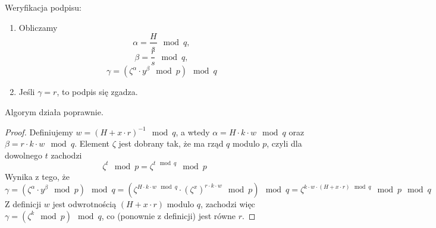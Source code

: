 \begin{greyframe}
    Weryfikacja podpisu:
    \begin{enumerate}
        \item Obliczamy
        \[
            \alpha = \frac{H}{s} \mod q,
        \]
        \[
            \beta = \frac{r}{s} \mod q,
        \]
        \[
            \gamma = (\zeta^{\alpha} \cdot y^{\beta} \mod p) \mod q
        \]
        \item Jeśli \( \gamma = r \), to podpis się zgadza.
    \end{enumerate}
\end{greyframe}

Algorym działa poprawnie.
\begin{proof}
    Definiujemy \( w = (H + x\cdot r)^{-1} \mod q \), a wtedy \( \alpha = H \cdot k \cdot w \mod q \) oraz \( \beta = r \cdot k \cdot w \mod q \).
    Element \( \zeta \) jest dobrany tak, że ma rząd \( q \) modulo \( p \), czyli dla dowolnego \( t \) zachodzi 
    \[
        \zeta^t \mod p = \zeta^{t \!\mod q} \mod p
    \]
    Wynika z tego, że
    \[
        \gamma = (\zeta^{\alpha} \cdot y^{\beta} \mod p) \mod q = (\zeta^{H \cdot k \cdot w \mod q} \cdot (\zeta^{x})^{r \cdot k \cdot w} \mod p) \mod q  = \zeta^{k \cdot w \cdot (H + x\cdot r) \mod q} \mod p \mod q
    \]
    Z definicji \( w \) jest odwrotnością \( (H + x\cdot r) \) modulo \( q \), zachodzi więc \( \gamma = (\zeta^k \mod p) \mod q \), co (ponownie z definicji) jest równe \( r \).
\end{proof}